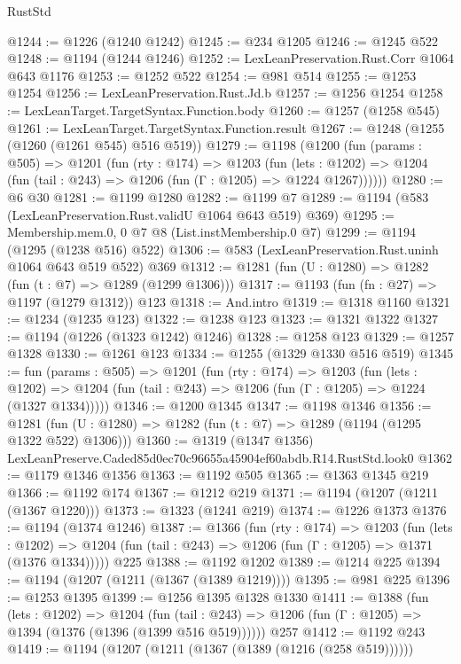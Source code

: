 \begin{lexlean}{RustStd}
\begin{coremodule}
@1244 := @1226 (@1240 @1242)
@1245 := @234 @1205
@1246 := @1245 @522
@1248 := @1194 (@1244 @1246)
@1252 := LexLeanPreservation.Rust.Corr @1064 @643 @1176
@1253 := @1252 @522
@1254 := @981 @514
@1255 := @1253 @1254
@1256 := LexLeanPreservation.Rust.Jd.b
@1257 := @1256 @1254
@1258 := LexLeanTarget.TargetSyntax.Function.body
@1260 := @1257 (@1258 @545)
@1261 := LexLeanTarget.TargetSyntax.Function.result
@1267 := @1248 (@1255 (@1260 (@1261 @545) @516 @519))
@1279 := @1198
    (@1200
      (fun (params : @505) =>
      @1201
        (fun (rty : @174) =>
        @1203
          (fun (lets : @1202) =>
          @1204 (fun (tail : @243) => @1206 (fun (Γ : @1205) => @1224 @1267))))))
@1280 := @6 @30
@1281 := @1199 @1280
@1282 := @1199 @7
@1289 := @1194 (@583 (LexLeanPreservation.Rust.validU @1064 @643 @519) @369)
@1295 := Membership.mem.{0, 0} @7 @8 (List.instMembership.{0} @7)
@1299 := @1194 (@1295 (@1238 @516) @522)
@1306 := @583 (LexLeanPreservation.Rust.uninh @1064 @643 @519 @522) @369
@1312 := @1281 (fun (U : @1280) => @1282 (fun (t : @7) => @1289 (@1299 @1306)))
@1317 := @1193 (fun (fn : @27) => @1197 (@1279 @1312)) @123
@1318 := And.intro
@1319 := @1318 @1160
@1321 := @1234 (@1235 @123)
@1322 := @1238 @123
@1323 := @1321 @1322
@1327 := @1194 (@1226 (@1323 @1242) @1246)
@1328 := @1258 @123
@1329 := @1257 @1328
@1330 := @1261 @123
@1334 := @1255 (@1329 @1330 @516 @519)
@1345 := fun (params : @505) =>
  @1201
    (fun (rty : @174) =>
    @1203
      (fun (lets : @1202) =>
      @1204 (fun (tail : @243) => @1206 (fun (Γ : @1205) => @1224 (@1327 @1334)))))
@1346 := @1200 @1345
@1347 := @1198 @1346
@1356 := @1281 (fun (U : @1280) => @1282 (fun (t : @7) => @1289 (@1194 (@1295 @1322 @522) @1306)))
@1360 := @1319 (@1347 @1356) LexLeanPreserve.Caded85d0ec70c96655a45904ef60abdb.R14.RustStd.look0
@1362 := @1179 @1346 @1356
@1363 := @1192 @505
@1365 := @1363 @1345 @219
@1366 := @1192 @174
@1367 := @1212 @219
@1371 := @1194 (@1207 (@1211 (@1367 @1220)))
@1373 := @1323 (@1241 @219)
@1374 := @1226 @1373
@1376 := @1194 (@1374 @1246)
@1387 := @1366
    (fun (rty : @174) =>
    @1203
      (fun (lets : @1202) =>
      @1204 (fun (tail : @243) => @1206 (fun (Γ : @1205) => @1371 (@1376 @1334)))))
    @225
@1388 := @1192 @1202
@1389 := @1214 @225
@1394 := @1194 (@1207 (@1211 (@1367 (@1389 @1219))))
@1395 := @981 @225
@1396 := @1253 @1395
@1399 := @1256 @1395 @1328 @1330
@1411 := @1388
    (fun (lets : @1202) =>
    @1204 (fun (tail : @243) => @1206 (fun (Γ : @1205) => @1394 (@1376 (@1396 (@1399 @516 @519))))))
    @257
@1412 := @1192 @243
@1419 := @1194 (@1207 (@1211 (@1367 (@1389 (@1216 (@258 @519))))))

\end{coremodule}
\end{lexlean}
